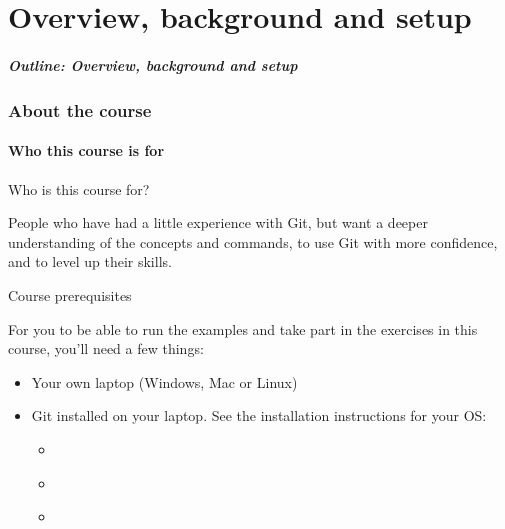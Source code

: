 \documentclass{git_course}
\begin{document}
\maketitle

\part{Overview, background and setup}

\begin{frame}
    \partpage
\end{frame}

\begin{frame}
    \frametitle{Outline: Overview, background and setup}
    \tableofcontents[
        currentsection, sectionstyle=show, subsectionstyle=show
    ]
\end{frame}

\section{About the course}

\subsection{Who this course is for}

\begin{frame}{Who is this course for?}

    People who have had a little experience with Git, but want a deeper
    understanding of the concepts and commands, to use Git with more
    confidence, and to level up their skills.

\end{frame}

\begin{frame}{Course prerequisites}

For you to be able to run the examples and take part in the exercises in
this course, you'll need a few things:
    \begin{itemize}
        \item Your own laptop (Windows, Mac or Linux)
        \item Git installed on your laptop.  See the installation
            instructions for your OS:
            \begin{itemize}
                \item \hyperlink{installing_git_windows}{}
                \item \hyperlink{installing_git_mac}{}
                \item \hyperlink{installing_git_linux}{}
            \end{itemize}
    \end{itemize}
\end{frame}
\end{document}
